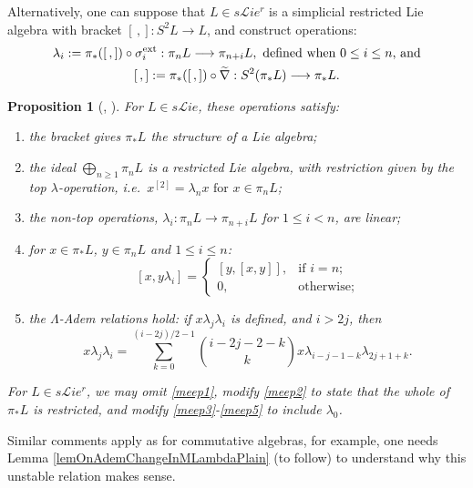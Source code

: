 \documentclass[11pt]{amsart} \renewcommand{\baselinestretch}{1.2}
\theoremstyle{plain}
\newtheorem{prop}[thm]{Proposition}
\numberwithin{equation}{section} %
\theoremstyle{plain}
\newtheorem{prop}[thm]{Proposition}
\numberwithin{equation}{chapter} %
\renewcommand{\to}{\longrightarrow}
\newcommand{\squishlist}{
}
\newcommand{\scrL}{\mathscr{L}}
\newcommand{\citeBOX}[2][]{\cite[\mbox{#1}]{#2}}
\newcommand{\restn}[1]{#1^{[2]}}
\newcommand{\liealgs}{{\scrL\!\textit{ie}}}
\newcommand{\restliealgs}{{\scrL\!\textit{ie}^\textit{r}}}
\begin{document}
\begin{Constructing homotopy operations}
Alternatively, one can suppose that $L\in s \restliealgs$ is a simplicial restricted Lie algebra with bracket $[\,,]:S^2L\to L$, and construct operations:
\begin{gather*}
\lambda_i:=\pi_*([\,,])\circ\sigma_i^\textup{ext}:\pi_nL\to \pi_{n+i}L,\textup{ defined when }0\leq i\leq n\textup{, and}\\
[\,,]:=\pi_*([\,,])\circ\widetilde{\nabla}:S^2(\pi_*L)\to \pi_{*}L.
\end{gather*}
\begin{prop}[{\cite{6Author.pdf}, \citeBOX[\S8]{CurtisSimplicialHtpy.pdf}}]
\label{omnibus on htpy of Lie algs}
For $L\in s \liealgs$, these operations satisfy:
\begin{enumerate}\squishlist
\item \label{meep1} the bracket gives $\pi_*L$ the structure of a Lie algebra;
\item \label{meep2} the ideal $\bigoplus_{n\geq1}\pi_nL$ is a restricted Lie algebra, with restriction given by the \emph{top $\lambda$-operation}, i.e.\ $\restn{x}=\lambda_nx\text{ for }x\in\pi_nL$;
\item \label{meep3} the \emph{non-top} operations, $\lambda_i:\pi_nL\to \pi_{n+i}L$ for $1\leq i<n$, are linear;
\item \label{meep4} for $x\in \pi_*L$, $y\in \pi_nL$ and $1\leq i\leq n$:
\[[x,y\lambda_i]=\begin{cases}
[y,[x,y]],&\text{if }i=n;\\
0,&\text{otherwise};
\end{cases}
\]
\item \label{meep5} the \emph{$\Lambda$-Adem relations} hold: if $x\lambda_j\lambda_i$ is defined, and $i>2j$, then
\[x\lambda_j\lambda_i=\sum_{k=0}^{(i-2j)/2-1}\binom{i-2j-2-k}{ k}x\lambda_{i-j-1-k}\lambda_{2j+1+k}.\]
\end{enumerate}
For $L\in s \restliealgs$, we may omit \ref{meep1}, modify \ref{meep2} to state that the whole of $\pi_*L$ is restricted, and modify \ref{meep3}-\ref{meep5} to include $\lambda_0$.
\end{prop}
Similar comments apply as for commutative algebras, for example, one needs Lemma \ref{lemOnAdemChangeInMLambdaPlain} (to follow) to understand why this unstable relation makes sense. 


\end{Constructing homotopy operations}
\end{document}
